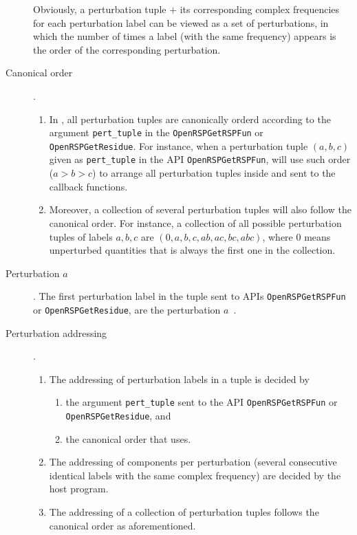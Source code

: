 \begin{description}
    Obviously, a perturbation tuple $+$ its corresponding complex
    frequencies for each perturbation label can be viewed as a set of
    perturbations, in which the number of times a label (with the same
    frequency) appears is the order of the corresponding perturbation.
  \item[Canonical order].
    \begin{enumerate}
      \item In \LibName, all perturbation tuples are canonically orderd
        according to the argument \texttt{pert\_tuple} in the \texttt{OpenRSPGetRSPFun}
        or \texttt{OpenRSPGetResidue}. For instance, when a perturbation tuple
        $(a,b,c)$ given as \texttt{pert\_tuple} in the API \texttt{OpenRSPGetRSPFun},
        \LibName will use such order ($a>b>c$) to arrange all perturbation
        tuples inside and sent to the callback functions.
      \item Moreover, a collection of several perturbation tuples will also
        follow the canonical order. For instance, a collection of all possible
        perturbation tuples of labels $a,b,c$ are $(0,a,b,c,ab,ac,bc,abc)$,
        where $0$ means unperturbed quantities that is always the first one
        in the collection.
    \end{enumerate}
  \item[Perturbation $a$]. The first perturbation label in the tuple sent to
    \LibName APIs \texttt{OpenRSPGetRSPFun} or \texttt{OpenRSPGetResidue}, are the
    perturbation $a$~\cite{Thorvaldsen-JCP-129-214108}.
  \item[Perturbation addressing].
    \begin{enumerate}
      \item The addressing of perturbation labels in a tuple is decided by
        \begin{enumerate}
          \item the argument \texttt{pert\_tuple} sent to the API \texttt{OpenRSPGetRSPFun}
            or \texttt{OpenRSPGetResidue}, and
          \item the canonical order that \LibName uses.
        \end{enumerate}
      \item The addressing of components per perturbation (several consecutive
        identical labels with the same complex frequency) are decided by the
        host program.
      \item The addressing of a collection of perturbation tuples follows the
        canonical order as aforementioned.
    \end{enumerate}


\end{description}
